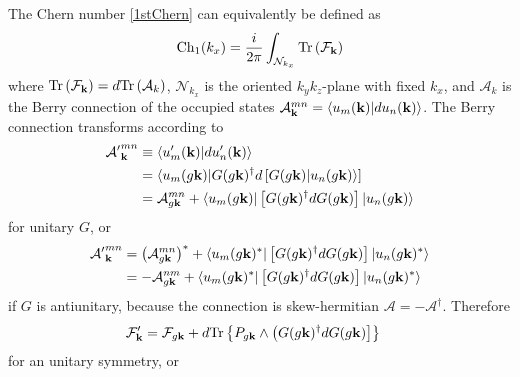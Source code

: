 The Chern number \eqref{1stChern} can equivalently be defined as \begin{align}\mathrm{Ch}_1(k_x)=\frac{i}{2\pi}\int_{\mathcal{N}_{k_x}}\mathrm{Tr}\left(\mathcal{F}_{\bf k}\right)\label{1stChernapp}\end{align} where $\mathrm{Tr}\left(\mathcal{F}_{\bf k}\right)=d\mathrm{Tr}\left(\mathcal{A}_k\right)$, $\mathcal{N}_{k_x}$ is the oriented $k_yk_z$-plane with fixed $k_x$, and $\mathcal{A}_k$ is the Berry connection of the occupied states $\mathcal{A}_{\bf k}^{mn}=\langle u_m({\bf k})|du_n({\bf k})\rangle$. The Berry connection transforms according to \begin{align}{\mathcal{A}'}_{\bf k}^{mn}&\equiv\langle u'_m({\bf k})|du'_n({\bf k})\rangle\\&=\langle u_m(g{\bf k})|G(g{\bf k})^\dagger d \left[G(g{\bf k})|u_n(g{\bf k})\rangle\right]\nonumber\\&=\mathcal{A}_{g{\bf k}}^{mn}+\langle u_m(g{\bf k})|\left[G(g {\bf k})^\dagger dG(g {\bf k})\right]|u_n(g{\bf k})\rangle\nonumber\end{align} for unitary $G$, or \begin{align}{\mathcal{A}'}_{\bf k}^{mn}&=\left(\mathcal{A}_{g{\bf k}}^{mn}\right)^\ast+\langle u_m(g{\bf k})^\ast|\left[G(g {\bf k})^\dagger dG(g {\bf k})\right]|u_n(g{\bf k})^\ast\rangle\nonumber\\&=-\mathcal{A}_{g{\bf k}}^{nm}+\langle u_m(g{\bf k})^\ast|\left[G(g {\bf k})^\dagger dG(g {\bf k})\right]|u_n(g{\bf k})^\ast\rangle\nonumber\end{align} if $G$ is antiunitary, because the connection is skew-hermitian $\mathcal{A}=-\mathcal{A}^\dagger$. Therefore \begin{align}%
\mathcal{F}'_{\bf k}&=\mathcal{F}_{g{\bf k}}+d\mathrm{Tr}\left\{P_{g\bf{k}}\wedge\left(G(g{\bf k})^\dagger dG(g{\bf k})\right]\right\}\label{curvature}\end{align} for an unitary symmetry, or \begin{align}%

\end{align}
